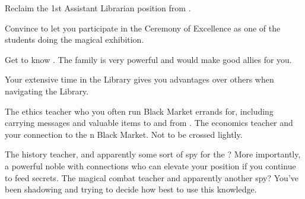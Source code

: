 \documentclass[char]{GL2020}
\begin{document}
\begin{itemz}
     \item Reclaim the 1st Assistant Librarian position from \cAmbition{}.
     \item Convince \cMusic{} to let you participate in the Ceremony of Excellence as one of the students doing the magical exhibition.
     \item Get to know \cChupStudent{}. The \cChupSecond{\formal} family is very powerful and would make good allies for you.
\end{itemz}

\begin{itemz}[Notes]
    \item Your extensive time in the Library gives you advantages over others when navigating the Library.
\end{itemz}

\begin{contacts}
    \contact{\cEthics{}} The ethics teacher who you often run Black Market errands for, including carrying messages and valuable items to and from \cChupSecond{}.
    \contact{\cChupSecond{}} The economics teacher and your connection to the \pEarth{}n Black Market. Not to be crossed lightly. 
\end{contacts}

\begin{contacts}
    \contact{\cHistory{}} The history teacher, and apparently some sort of spy for the \pFarm{}? More importantly, a powerful noble with connections who can elevate your position if you continue to feed \cHistory{\them} secrets.
    \contact{\cInterpol{}} The magical combat teacher and apparently another spy? You've been shadowing \cInterpol{} and trying to decide how best to use this knowledge. 
\end{contacts}
\end{document}
